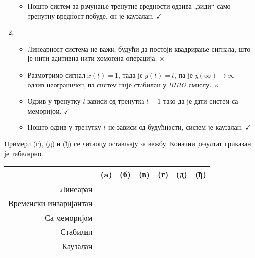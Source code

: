 \begin{enumerate}[label=(\alph*)]
\begin{itemize}
        \item Пошто систем за рачунање тренутне вредности одзива „види“ само тренутну вредност побуде, он је каузалан. \hfill $\checkmark$
    \end{itemize} 

    \item 
    \begin{itemize}
        \item Линеарност система не важи, будући да постоји квадрирање сигнала, што је нити адитивна нити хомогена операција.
        \hfill $\times$

        \item Размотримо сигнал $x(t) = 1$, тада је $y(t) = t$, па је $y(\infty)\to\infty$ одзив неограничен, па 
        систем није стабилан у \textit{BIBO} смислу. \hfill $\times$

        \item Одзив у тренутку $t$ зависи од тренутка  $t-1$ тако да је дати систем са меморијом. \hfill $\checkmark$
        
        \item Пошто одзив у тренутку $t$ не зависи од будућности, систем је каузалан. \hfill $\checkmark$
    \end{itemize}
\end{enumerate}

Примери (г), (д) и (ђ) се читаоцу остављају за вежбу. Коначни резултат приказан је табеларно. 

\begin{center}
\newcommand{\cm}{\checkmark}
\begin{tabular}{r|cccccc}
    & (a) & (б) & (в) & (г) & (д) & (ђ) \\
     \hline
    Линеаран               
    & \cm & \cm &    & \cm & \cm &    \\ 
    Временски инваријантан 
    & \cm    & \cm &    &     &  \cm   &    \\ 
    Са меморијом 
    & \cm &     &\cm & \cm &   \cm  & \\
    Стабилан 
    &     & \cm  &  & &  & \cm \\
    Каузалан 
    & \cm & \cm & \cm & \cm & & \cm \\
    \end{tabular}
\end{center}    
